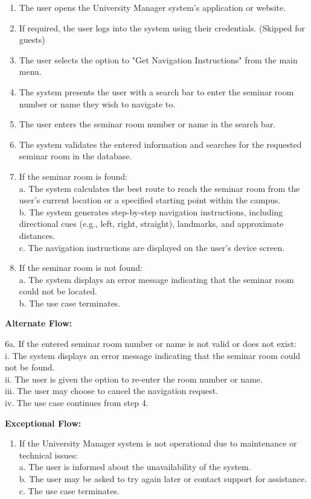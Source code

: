 \documentclass[conference,onecolumn]{IEEEtran}
\begin{document}
\begin{framed}
	\begin{enumerate}
		\item     The user opens the University Manager system's application or website.
		\item If required, the user logs into the system using their credentials. (Skipped for guests)
		\item The user selects the option to "Get Navigation Instructions" from the main menu.
		\item The system presents the user with a search bar to enter the seminar room number or name they wish to navigate to.
		\item The user enters the seminar room number or name in the search bar.
		\item The system validates the entered information and searches for the requested seminar room in the database.
		\item If the seminar room is found:\\
		a. The system calculates the best route to reach the seminar room from the user's current location or a specified starting point within the campus.\\
		b. The system generates step-by-step navigation instructions, including directional cues (e.g., left, right, straight), landmarks, and approximate distances.\\
		c. The navigation instructions are displayed on the user's device screen.
		\item If the seminar room is not found:\\
		a. The system displays an error message indicating that the seminar room could not be located.\\
		b. The use case terminates.
	\end{enumerate}
	
	\textbf{Alternate Flow:}
	
	6a. If the entered seminar room number or name is not valid or does not exist:\\
	i. The system displays an error message indicating that the seminar room could not be found.\\
	ii. The user is given the option to re-enter the room number or name.\\
	iii. The user may choose to cancel the navigation request.\\
	iv. The use case continues from step 4.
	
	\textbf{Exceptional Flow:}
	
	\begin{enumerate}
		\item If the University Manager system is not operational due to maintenance or technical issues:\\
		a. The user is informed about the unavailability of the system.\\
		b. The user may be asked to try again later or contact support for assistance.\\
		c. The use case terminates.
	\end{enumerate}
	

\end{framed}
\end{document}
